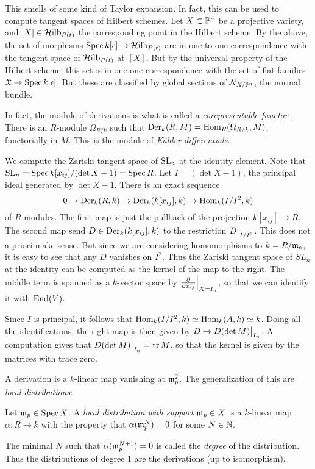 \documentclass[11pt, english]{article}
\begin{document}
\begin{remark}
This smells of some kind of Taylor expansion. In fact, this can be used to compute tangent spaces of Hilbert schemes. Let $X \subset \mathbb{P}^n$ be a projective variety, and $[X] \in \mathcal{H}\mathrm{ilb}_{P(t)}$ the corresponding point in the Hilbert scheme. By the above, the set of morphisms $\operatorname{Spec} k[\epsilon] \to \mathcal{H}\mathrm{ilb}_{P(t)}$ are in one to one correspondence with the tangent space of $\mathcal{H}\mathrm{ilb}_{P(t)}$ at $[X]$. But by the universal property of the Hilbert scheme, this set is in one-one correspondence with the set of flat families $\mathfrak X \to \operatorname{Spec} k[\epsilon]$. But these are classified by global sections of $\mathcal N_{X/\mathbb{P}^n}$, the normal bundle.
\end{remark}

In fact, the module of derivations is what is called a \emph{corepresentable functor}. There is an $R$-module $\Omega_{R/k}$ such that $\operatorname{Der}_k(R,M)=\operatorname{Hom}_R(\Omega_{R/k},M)$, functorially in $M$. This is the module of \emph{Kähler differentials}.

\begin{example}
We compute the Zariski tangent space of $\operatorname{SL}_n$ at the identity element. Note that $\operatorname{SL}_n=\operatorname{Spec} k[x_{ij}]/(\det X-1)=\operatorname{Spec} R$. Let $I=(\det X-1)$, the principal ideal generated by $\det X-1$. There is an exact sequence
$$
0 \to \operatorname{Der}_k(R,k) \to \operatorname{Der}_k(k[x_{ij}],k) \to \operatorname{Hom}_k(I/I^2,k)
$$
of $R$-modules. The first map is just the pullback of the projection $k[x_{ij}] \to R$. The second map send $D \in \operatorname{Der}_k(k[x_{ij}],k)$ to the restriction $\restr{D}{I/I^2}$. This does not a priori make sense. But since we are considering homomorphisms to $k=R/\mathfrak{m}_e$, it is easy to see that any $D$ vanishes on $I^2$. Thus the Zariski tangent space of $SL_n$ at the identity can be computed as the kernel of the map to the right. The middle term is spanned as a $k$-vector space by $\restr{\dd{}{x_{ij}}}{X=I_n}$, so that we can identify it with $\operatorname{End}(V)$.

Since $I$ is principal, it follows that $\operatorname{Hom}_k(I/I^2,k) \simeq \operatorname{Hom}_k(A,k) \simeq k$. Doing all the identifications, the right map is then given by $D \mapsto \restr{D(\det M)}{I_n}$. A computation gives that $\restr{D(\det M)}{I_n}=\tr M $, so that the kernel is given by the matrices with trace zero.
\end{example}

A derivation is a $k$-linear map vanishing at $\mathfrak{m}_p^2$. The generalization of this are \emph{local distributions}:

\begin{defi}
Let $\mathfrak{m}_p \in \operatorname{Spec} X$. A \emph{local distribution with support $\mathfrak{m}_p \in X$} is a $k$-linear map $\alpha:R \to k$ with the property that $\alpha(\mathfrak{m}_p^N)=0$ for some $N \in \mathbb{N}$.

The minimal $N$ such that $\alpha(\mathfrak{m}_p^{N+1})=0$ is called the \emph{degree} of the distribution. Thus the distributions of degree $1$ are the derivations (up to isomorphism).
\end{defi}
\end{document}
